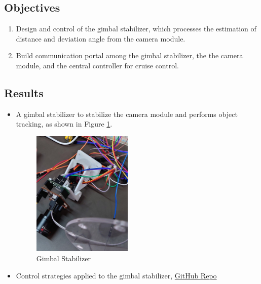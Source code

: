 \documentclass[12pt]{article}
\begin{document}
\subsection{Objectives}

\begin{enumerate}

    \item {Design and control of the gimbal stabilizer, which processes the estimation of distance and deviation angle from the camera module.}
    \item {Build communication portal among the gimbal stabilizer, the the camera module, and the central controller for cruise control.}

\end{enumerate}

\subsection{Results}

\begin{itemize}

    \item {A gimbal stabilizer to stabilize the camera module and performs object tracking, as shown in Figure \ref*{Stabilizer-Control}.}
    \begin{figure}[H]
        \centering
        \includegraphics[width=0.45\textwidth]{portfolio/Gimbal.JPG}
        \caption{Gimbal Stabilizer}
        \label{Stabilizer-Control}
    \end{figure}
    \item {Control strategies applied to the gimbal stabilizer,  \href{https://github.com/Robin0265/StablerCTRL}{GitHub Repo}}
\end{itemize}

\end{document}
